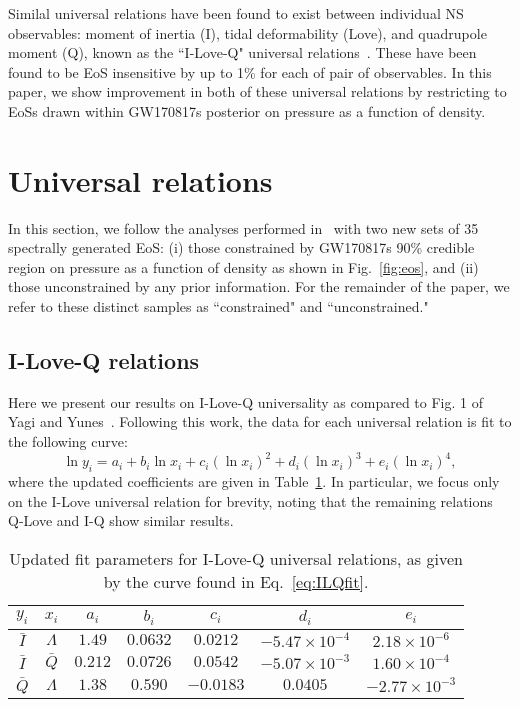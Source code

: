 \documentclass[prd,twocolumn,nofootinbib,superscriptaddress,amsmath,amssymb]{revtex4-1}
\begin{document}
Similal universal relations have been found to exist between individual NS observables: moment of inertia (I), tidal deformability (Love), and quadrupole moment (Q), known as the ``I-Love-Q" universal relations~\cite{Yagi:ILQ}.
These have been found to be EoS insensitive by up to 1\% for each of pair of observables.
In this paper, we show improvement in both of these universal relations by restricting to EoSs drawn within GW170817s posterior on pressure as a function of density.
\section{Universal relations}\label{sec:universal}
In this section, we follow the analyses performed in~\cite{Yagi:binLove,Yagi:ILQ} with two new sets of 35 spectrally generated EoS: (i) those constrained by GW170817s 90\% credible region on pressure as a function of density as shown in Fig.~\ref{fig:eos}, and (ii) those unconstrained by any prior information.
For the remainder of the paper, we refer to these distinct samples as ``constrained" and ``unconstrained." 

\subsection{I-Love-Q relations}\label{sec:ilq}
Here we present our results on I-Love-Q universality as compared to Fig. 1 of Yagi and Yunes~\cite{Yagi:ILQ}.
Following this work, the data for each universal relation is fit to the following curve:
\begin{equation}\label{eq:ILQfit}
\ln{y_i}=a_i+b_i \ln{x_i} + c_i (\ln{x_i})^2 + d_i (\ln{x_i})^3 + e_i (\ln{x_i})^4,
\end{equation}
where the updated coefficients are given in Table~\ref{tab:ILQfit}.
In particular, we focus only on the I-Love universal relation for brevity, noting that the remaining relations Q-Love and I-Q show similar results.

\begin{table}[ht!]
\centering
\caption{
Updated fit parameters for I-Love-Q universal relations, as given by the curve found in Eq.~\ref{eq:ILQfit}.
}\label{tab:ILQfit}
\begin{tabular}{ c  c | c c c c c } 
 \hline
 \hline
 $y_i$ & $x_i$ & $a_i$ & $b_i$ & $c_i$ & $d_i$ & $e_i$ \\
 \hline
 $\bar{I}$ & $\Lambda$ & $1.49$ & $0.0632$ & $0.0212$ & $-5.47 \times 10^{-4}$ & $2.18 \times 10^{-6}$ \\
 $\bar{I}$ & $\bar{Q}$ & $0.212$ & $0.0726$ & $0.0542$ & $-5.07 \times 10^{-3}$ & $1.60 \times 10^{-4}$ \\
 $\bar{Q}$ & $\Lambda$ & $1.38$ & $0.590$ & $-0.0183$ & $0.0405$ & $-2.77 \times 10^{-3}$ \\ 
 \hline
 \hline
\end{tabular}
\end{table}
\end{document}
